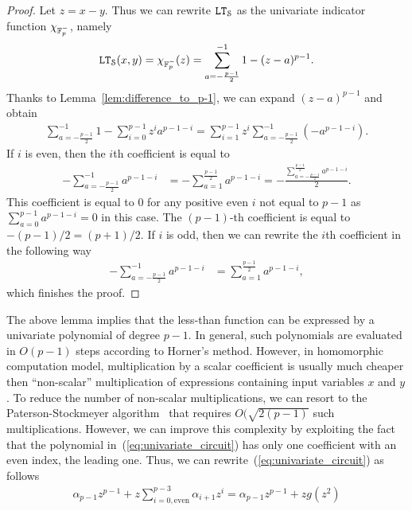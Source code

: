   \begin{proof}
    Let $z = x-y$.
    Thus we can rewrite $\mathtt{LT}_{\mathcal{S}}$ as the univariate indicator function $\chi_{\mathbb{F}_p^-}$, namely
    \begin{align*}
      \mathtt{LT}_{\mathcal{S}}(x,y) = \chi_{\mathbb{F}_p^-}(z) = \sum_{a=-\frac{p-1}{2}}^{-1} 1 - (z - a)^{p-1}.
    \end{align*}
    Thanks to Lemma~\ref{lem:difference_to_p-1}, we can expand $(z-a)^{p-1}$ and obtain
    \begin{align*}
      \sum_{a=-\frac{p-1}{2}}^{-1} 1 - \sum_{i=0}^{p-1} z^i a^{p-1-i}
      = \sum_{i=1}^{p-1} z^i \sum_{a=-\frac{p-1}{2}}^{-1} (-a^{p-1-i}).
    \end{align*}
    If $i$ is even, then the $i$th coefficient is equal to
    \begin{align*}
      -\sum_{a=-\frac{p-1}{2}}^{-1} a^{p-1-i} &= -\sum_{a=1}^{\frac{p-1}{2}} a^{p-1-i} = -\frac{\sum_{a=-\frac{p-1}{2}}^{\frac{p-1}{2}} a^{p-1-i}}{2}.
    \end{align*}
    This coefficient is equal to $0$ for any positive even $i$ not equal to $p-1$ as $\sum_{a=0}^{p-1} a^{p-1-i} = 0$ in this case.
    The $(p-1)$-th coefficient is equal to $-(p-1)/2 = (p+1)/2$.
    If $i$ is odd, then we can rewrite the $i$th coefficient in the following way
    \begin{align*}
      -\sum_{a=-\frac{p-1}{2}}^{-1} a^{p-1-i} &= \sum_{a=1}^{\frac{p-1}{2}} a^{p-1-i},
    \end{align*}
    which finishes the proof.
  \end{proof}
  The above lemma implies that the less-than function can be expressed by a univariate polynomial of degree $p-1$.
  In general, such polynomials are evaluated in $O(p-1)$ steps according to Horner's method.
  However, in homomorphic computation model, multiplication by a scalar coefficient is usually much cheaper then ``non-scalar'' multiplication of expressions containing input variables $x$ and $y$.
  To reduce the number of non-scalar multiplications, we can resort to the Paterson-Stockmeyer algorithm~\cite{SIAM:PS73} that requires $O(\sqrt{2(p-1)}$ such multiplications.
  However, we can improve this complexity by exploiting the fact that the polynomial in~(\ref{eq:univariate_circuit}) has only one coefficient with an even index, the leading one.
  Thus, we can rewrite~(\ref{eq:univariate_circuit}) as follows
  \begin{align*}
    \alpha_{p-1} z^{p-1} + z \sum_{i=0, \text{even}}^{p-3} \alpha_{i+1} z^i =  \alpha_{p-1} z^{p-1} + z g(z^2)
  \end{align*}
